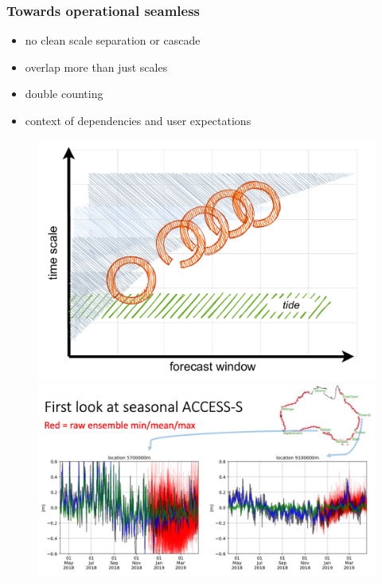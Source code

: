 \begin{frame}
\frametitle{Towards operational seamless}
\begin{itemize}
    \item no clean scale separation or cascade
    \item overlap more than just scales
    \item double counting 
    \item context of dependencies and user expectations
\end{itemize}

    
    \begin{figure}      
    \includegraphics[height=0.3\textheight]{figures/diagrams/scales_with_broken_chain.pdf}
    \includegraphics[height=0.3\textheight]{figures/plots/placeholder_accessS_timeseries.png}
    \end{figure}

\end{frame}